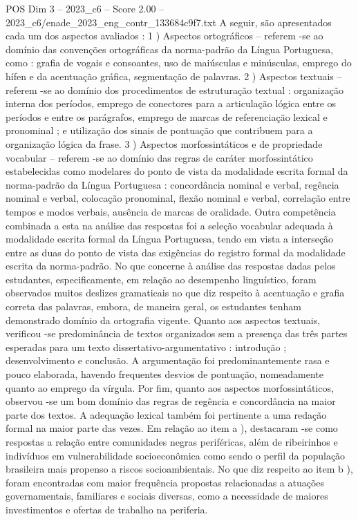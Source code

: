 \begin{textsample}{POS Dim 3 – 2023\_c6 – Score 2.00 – 2023\_c6/enade\_2023\_eng\_contr\_133684c9f7.txt}
A seguir, são apresentados cada um dos aspectos avaliados : 1 ) Aspectos ortográficos – referem -se ao domínio das convenções ortográficas da norma-padrão da Língua Portuguesa, como : grafia de vogais e consoantes, uso de maiúsculas e minúsculas, emprego do hífen e da acentuação gráfica, segmentação de palavras. 2 ) Aspectos textuais – referem -se ao domínio dos procedimentos de estruturação textual : organização interna dos períodos, emprego de conectores para a articulação lógica entre os períodos e entre os parágrafos, emprego de marcas de referenciação lexical e pronominal ; e utilização dos sinais de pontuação que contribuem para a organização lógica da frase. 3 ) Aspectos morfossintáticos e de propriedade vocabular – referem -se ao domínio das regras de caráter morfossintático estabelecidas como modelares do ponto de vista da modalidade escrita formal da norma-padrão da Língua Portuguesa : concordância nominal e verbal, regência nominal e verbal, colocação pronominal, flexão nominal e verbal, correlação entre tempos e modos verbais, ausência de marcas de oralidade.
Outra competência combinada a esta na análise das respostas foi a seleção vocabular adequada à modalidade escrita formal da Língua Portuguesa, tendo em vista a interseção entre as duas do ponto de vista das exigências do registro formal da modalidade escrita da norma-padrão.
No que concerne à análise das respostas dadas pelos estudantes, especificamente, em relação ao desempenho linguístico, foram observados muitos deslizes gramaticais no que diz respeito à acentuação e grafia correta das palavras, embora, de maneira geral, os estudantes tenham demonstrado domínio da ortografia vigente.
Quanto aos aspectos textuais, verificou -se predominância de textos organizados sem a presença das três partes esperadas para um texto dissertativo-argumentativo : introdução ; desenvolvimento e conclusão.
A argumentação foi predominantemente rasa e pouco elaborada, havendo frequentes desvios de pontuação, nomeadamente quanto ao emprego da vírgula.
Por fim, quanto aos aspectos morfossintáticos, observou -se um bom domínio das regras de regência e concordância na maior parte dos textos.
A adequação lexical também foi pertinente a uma redação formal na maior parte das vezes.
Em relação ao item a ), destacaram -se como respostas a relação entre comunidades negras periféricas, além de ribeirinhos e indivíduos em vulnerabilidade socioeconômica como sendo o perfil da população brasileira mais propenso a riscos socioambientais.
No que diz respeito ao item b ), foram encontradas com maior frequência propostas relacionadas a atuações governamentais, familiares e sociais diversas, como a necessidade de maiores investimentos e ofertas de trabalho na periferia.

\end{textsample}
